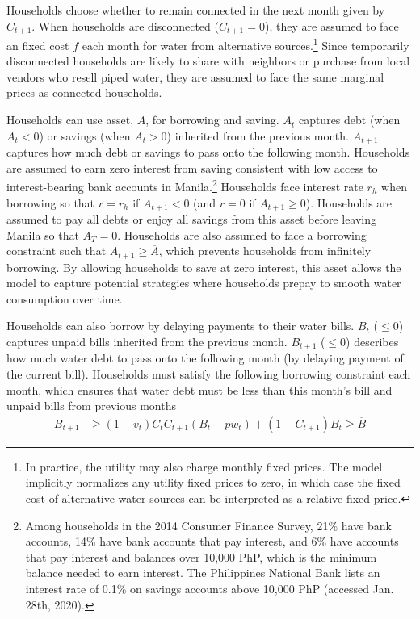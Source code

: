 \documentclass[12pt]{article}
\begin{document}
Households choose whether to remain connected in the next month given by $C_{t+1}$.  When households are disconnected ($C_{t+1}=0$), they are assumed to face an fixed cost $f$ each month for water from alternative sources.\footnote{In practice, the utility may also charge monthly fixed prices.  The model implicitly normalizes any utility fixed prices to zero, in which case the fixed cost of alternative water sources can be interpreted as a relative fixed price.}  Since temporarily disconnected households are likely to share with neighbors or purchase from local vendors who resell piped water, they are assumed to face the same marginal prices as connected households.

Households can use asset, $A$, for borrowing and saving.  $A_t$ captures debt (when $A_t<0$) or savings (when $A_t>0$) inherited from the previous month.  $A_{t+1}$ captures how much debt or savings to pass onto the following month.  Households are assumed to earn zero interest from saving consistent with low access to interest-bearing bank accounts in Manila.\footnote{Among households in the 2014 Consumer Finance Survey, 21\% have bank accounts, 14\% have bank accounts that pay interest, and 6\% have accounts that pay interest and balances over 10,000 PhP, which is the minimum balance needed to earn interest.  The Philippines National Bank lists an interest rate of 0.1\% on savings accounts above 10,000 PhP (accessed Jan. 28th, 2020).} Households face interest rate $r_h$ when borrowing so that  $r=r_h$ if $A_{t+1}<0$ (and $r = 0$ if $A_{t+1}\geq 0$).  Households are assumed to pay all debts or enjoy all savings from this asset before leaving Manila so that $A_{T}=0$.  Households are also assumed to face a borrowing constraint such that $A_{t+1}\geq\overline{A}$, which prevents households from infinitely borrowing.  By allowing households to save at zero interest, this asset allows the model to capture potential strategies where households prepay to smooth water consumption over time.

Households can also borrow by delaying payments to their water bills.  $B_t$ ($\leq0$) captures unpaid bills inherited from the previous month.  $B_{t+1}$ ($\leq0$) describes how much water debt to pass onto the following month (by delaying payment of the current bill).  Households must satisfy the following borrowing constraint each month, which ensures that water debt must be less than this month's bill and unpaid bills from previous months
\begin{align}\label{eq:borrowingconstraint}
B_{t+1} &\geq (1-v_t)  C_{t} C_{t+1} (B_t -pw_t) + (1-C_{t+1})B_t  \geq \overline{B}
\end{align}
\end{document}
